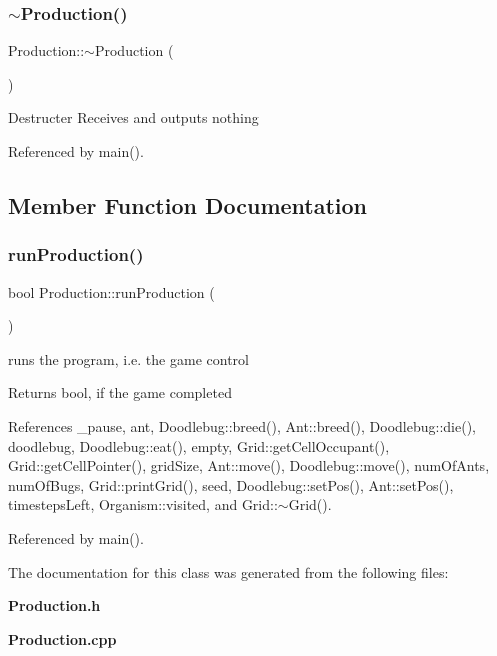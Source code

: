 \mbox{\label{classProduction_ab5b3060f9e0a2bc189844e426d693dab}} 
\subsubsection{$\sim$\+Production()}
{\footnotesize\ttfamily Production\+::$\sim$\+Production (\begin{DoxyParamCaption}{ }\end{DoxyParamCaption})\hspace{0.3cm}{\ttfamily [virtual]}}

Destructer Receives and outputs nothing 

Referenced by main().



\subsection{Member Function Documentation}
\mbox{\label{classProduction_a1d66853eafae2580089eff44f12f07ba}} 
\subsubsection{run\+Production()}
{\footnotesize\ttfamily bool Production\+::run\+Production (\begin{DoxyParamCaption}{ }\end{DoxyParamCaption})}

runs the program, i.\+e. the game control \begin{DoxyReturn}{Returns}
bool, if the game completed 
\end{DoxyReturn}


References \+\_\+pause, ant, Doodlebug\+::breed(), Ant\+::breed(), Doodlebug\+::die(), doodlebug, Doodlebug\+::eat(), empty, Grid\+::get\+Cell\+Occupant(), Grid\+::get\+Cell\+Pointer(), grid\+Size, Ant\+::move(), Doodlebug\+::move(), num\+Of\+Ants, num\+Of\+Bugs, Grid\+::print\+Grid(), seed, Doodlebug\+::set\+Pos(), Ant\+::set\+Pos(), timesteps\+Left, Organism\+::visited, and Grid\+::$\sim$\+Grid().



Referenced by main().



The documentation for this class was generated from the following files\+:\begin{DoxyCompactItemize}
\item 
\textbf{ Production.\+h}\item 
\textbf{ Production.\+cpp}\end{DoxyCompactItemize}
